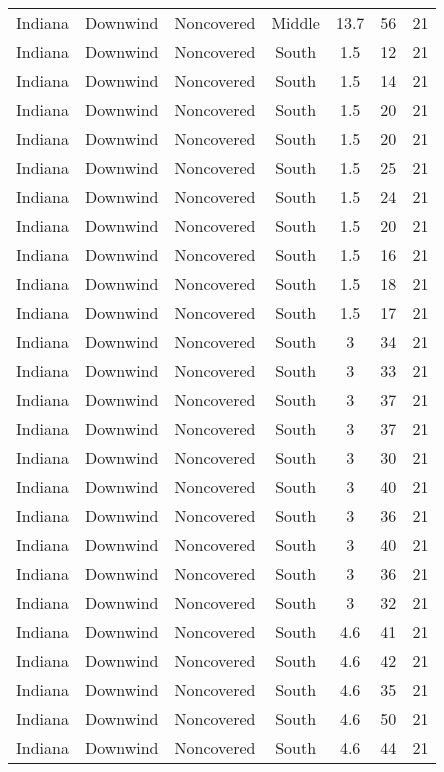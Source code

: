 \documentclass{article}
\begin{document}
\begin{longtable}[H]{ccccccc}
Indiana & Downwind & Noncovered & Middle & 13.7 & 56 & 21 \\
Indiana & Downwind & Noncovered & South  & 1.5  & 12 & 21 \\
Indiana & Downwind & Noncovered & South  & 1.5  & 14 & 21 \\
Indiana & Downwind & Noncovered & South  & 1.5  & 20 & 21 \\
Indiana & Downwind & Noncovered & South  & 1.5  & 20 & 21 \\
Indiana & Downwind & Noncovered & South  & 1.5  & 25 & 21 \\
Indiana & Downwind & Noncovered & South  & 1.5  & 24 & 21 \\
Indiana & Downwind & Noncovered & South  & 1.5  & 20 & 21 \\
Indiana & Downwind & Noncovered & South  & 1.5  & 16 & 21 \\
Indiana & Downwind & Noncovered & South  & 1.5  & 18 & 21 \\
Indiana & Downwind & Noncovered & South  & 1.5  & 17 & 21 \\
Indiana & Downwind & Noncovered & South  & 3    & 34 & 21 \\
Indiana & Downwind & Noncovered & South  & 3    & 33 & 21 \\
Indiana & Downwind & Noncovered & South  & 3    & 37 & 21 \\
Indiana & Downwind & Noncovered & South  & 3    & 37 & 21 \\
Indiana & Downwind & Noncovered & South  & 3    & 30 & 21 \\
Indiana & Downwind & Noncovered & South  & 3    & 40 & 21 \\
Indiana & Downwind & Noncovered & South  & 3    & 36 & 21 \\
Indiana & Downwind & Noncovered & South  & 3    & 40 & 21 \\
Indiana & Downwind & Noncovered & South  & 3    & 36 & 21 \\
Indiana & Downwind & Noncovered & South  & 3    & 32 & 21 \\
Indiana & Downwind & Noncovered & South  & 4.6  & 41 & 21 \\
Indiana & Downwind & Noncovered & South  & 4.6  & 42 & 21 \\
Indiana & Downwind & Noncovered & South  & 4.6  & 35 & 21 \\
Indiana & Downwind & Noncovered & South  & 4.6  & 50 & 21 \\
Indiana & Downwind & Noncovered & South  & 4.6  & 44 & 21 \\

\end{longtable}
\end{document}

